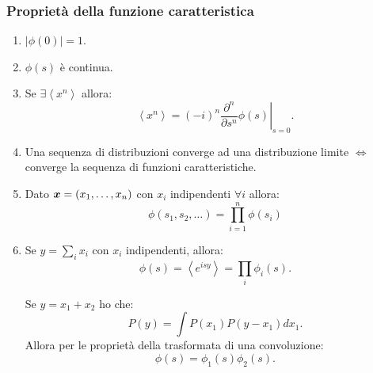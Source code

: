 \subsubsection{Proprietà della funzione caratteristica}%
\label{ssub:Proprietà della funzione caratteristica}
\begin{enumerate}
    \item $\left|\phi (0) \right|= 1 $.
    \item $\phi (s) $ è continua.
    \item Se $\exists \left<x^n\right>$ allora: 
	\[
		\left<x^n\right> = \left(-i\right)^n \left.\frac{\partial ^n}{\partial s^n} \phi (s)\right|_{s=0} 
	.\] 
    \item Una sequenza di distribuzioni converge ad una distribuzione limite $\iff$ converge la sequenza di funzioni caratteristiche.
    \item Dato $\boldsymbol{x} = \left(x_1, \ldots, x_n\right)$ con $x_i$ indipendenti $\forall i$ allora:
	\[ 
	    \phi (s_1, s_2, \ldots) = \prod_{i=1}^{n} \phi (s_i)  
	\]
    \item Se $y = \sum_{i}^{} x_i$ con $x_i$ indipendenti, allora:
	\[
	    \phi (s) = \left<e^{isy}\right> = \prod_{i}^{} \phi_i(s)  
	.\] 
	\begin{exmp}
	    Se $y = x_1 + x_2$ ho che:
	    \[
		P(y) = \int P(x_1) P(y-x_1) dx_1
	    .\] 
	    Allora per le proprietà della trasformata di una convoluzione:
	    \[
		\phi (s) = \phi_1(s) \phi_2(s) 
	    .\] 
	\end{exmp}
\end{enumerate}
\clearpage
